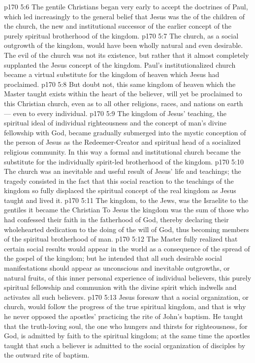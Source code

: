 \vs p170 5:6 \pc {}\bibnobreakspace The gentile Christians began very early to accept the doctrines of Paul, which led increasingly to the general belief that Jesus was the  of the children of the church, the new and institutional successor of the earlier concept of the purely spiritual brotherhood of the kingdom.
\vs p170 5:7 \pc The church, as a social outgrowth of the kingdom, would have been wholly natural and even desirable. The evil of the church was not its existence, but rather that it almost completely supplanted the Jesus concept of the kingdom. Paul’s institutionalized church became a virtual substitute for the kingdom of heaven which Jesus had proclaimed.
\vs p170 5:8 But doubt not, this same kingdom of heaven which the Master taught exists within the heart of the believer, will yet be proclaimed to this Christian church, even as to all other religions, races, and nations on earth --- even to every individual.
\vs p170 5:9 The kingdom of Jesus’ teaching, the spiritual ideal of individual righteousness and the concept of man’s divine fellowship with God, became gradually submerged into the mystic conception of the person of Jesus as the Redeemer\hyp{}Creator and spiritual head of a socialized religious community. In this way a formal and institutional church became the substitute for the individually spirit\hyp{}led brotherhood of the kingdom.
\vs p170 5:10 The church was an inevitable and useful  result of Jesus’ life and teachings; the tragedy consisted in the fact that this social reaction to the teachings of the kingdom so fully displaced the spiritual concept of the real kingdom as Jesus taught and lived it.
\vs p170 5:11 The kingdom, to the Jews, was the Israelite  to the gentiles it became the Christian  To Jesus the kingdom was the sum of those  who had confessed their faith in the fatherhood of God, thereby declaring their wholehearted dedication to the doing of the will of God, thus becoming members of the spiritual brotherhood of man.
\vs p170 5:12 The Master fully realized that certain social results would appear in the world as a consequence of the spread of the gospel of the kingdom; but he intended that all such desirable social manifestations should appear as unconscious and inevitable outgrowths, or natural fruits, of this inner personal experience of individual believers, this purely spiritual fellowship and communion with the divine spirit which indwells and activates all such believers.
\vs p170 5:13 Jesus foresaw that a social organization, or church, would follow the progress of the true spiritual kingdom, and that is why he never opposed the apostles’ practicing the rite of John’s baptism. He taught that the truth\hyp{}loving soul, the one who hungers and thirsts for righteousness, for God, is admitted by faith to the spiritual kingdom; at the same time the apostles taught that such a believer is admitted to the social organization of disciples by the outward rite of baptism.
